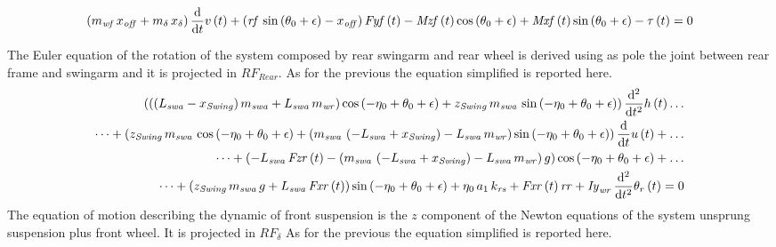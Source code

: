 %
\footnotesize
\begin{equation}
\displaystyle
\left( m_{{\it wf}}\,x_{{\it off}}+m_{\delta}\,x_{\delta} \right) {\frac {\rm d}{{\rm d}t}}v \left( t \right) + \left( {\it rf}\,\sin \left( \theta_{0}+\epsilon \right) -x_{{\it off}} \right) {\it Fyf} \left( t \right) -{\it Mzf} \left( t \right) \cos \left( \theta_{0}+\epsilon \right) +{\it Mxf} \left( t \right) \sin \left( \theta_{0}+\epsilon \right) -\tau \left( t \right)  = 0 
\end{equation}
\normalsize
%

The Euler equation of the rotation of the system composed by rear swingarm and rear wheel is derived using as pole the joint between rear frame and swingarm and it is projected in $RF_{Rear}$.
As for the previous the equation simplified is reported here.
%
\footnotesize
\begin{equation}
\begin{split}
\left( \left(  \left( L_{{\it swa}}-x_{{\it Swing}} \right) m_{{\it swa}}+L_{{\it swa}}\,m_{{\it wr}} \right) \cos \left( -\eta_{0}+\theta_{0}+\epsilon \right) +z_{{\it Swing}}\,m_{{\it swa}}\,\sin \left( -\eta_{0}+\theta_{0}+\epsilon \right) \right) {\frac {{\rm d}^{2}}{{\rm d}{t}^{2}}}h \left( t \right) \dots \\
\dots + \left( z_{{\it Swing}}\,m_{{\it swa}}\,\cos\left( -\eta_{0}+\theta_{0}+\epsilon \right) + \left( m_{{\it swa}}\,\left( -L_{{\it swa}}+x_{{\it Swing}} \right) -L_{{\it swa}}\,m_{{\it wr}} \right) \sin \left( -\eta_{0}+\theta_{0}+\epsilon \right) \right) {\frac {\rm d}{{\rm d}t}}u \left( t \right) + \dots \\
\dots + \left( -L_{{\it swa}}\,{\it Fzr} \left( t \right) - \left( m_{{\it swa}}\, \left( -L_{{\it swa}}+x_{{\it Swing}} \right) -L_{{\it swa}}\,m_{{\it wr}} \right) g \right) \cos \left( -\eta_{0}+\theta_{0}+\epsilon \right) + \dots\\
\dots + \left( z_{{\it Swing}}\,m_{{\it swa}}\,g+L_{{\it swa}}\,{\it Fxr} \left( t \right)  \right) \sin \left( -\eta_{0}+\theta_{0}+\epsilon \right) +\eta_{0}\,a_{1}\,k_{{\it rs}}+{\it Fxr} \left( t \right) {\it rr} +{\it Iy}_{{\it wr}}\,{\frac {{\rm d}^{2}}{{\rm d}{t}^{2}}}\theta_{r} \left( t \right)  = 0
\end{split}   
\end{equation}
\normalsize
%
The equation of motion describing the dynamic of front suspension is the $z$ component of the Newton equations of the system unsprung suspension plus front wheel. It is projected in $RF_\delta$
As for the previous the equation simplified is reported here.
